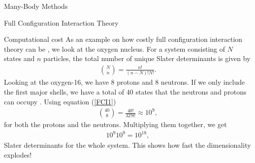 \documentclass[twoside,english]{uiofysmaster}
\begin{document}
\begin{chapter}{Many-Body Methods}
\begin{section}{Full Configuration Interaction Theory}
		\begin{subsection}{Computational cost}
			As an example on how costly  full configuration interaction theory can be \cite{MHJFCI}, we look at the oxygen nucleus. For a system consisting of $N$ states and $n$ particles, the total number of unique Slater determinants is given by 
			\begin{align}
				\binom{N}{n} = \frac{n!}{(n-N)!N!}.
				\label{FCI1}
			\end{align}
			Looking at the oxygen-16, we have $8$ protons and $8$ neutrons. If we only include the first major shells, we have a total of $40$ states that the neutrons and protons can occupy \cite{MHJFCI}. Using equation (\ref{FCI1})
			\begin{align}
				\binom{40}{8} = \frac{40!}{32!8!} \approx 10^9,
			\end{align}
			for both the protons and the neutrons. Multiplying them together, we get 
			\begin{align}
				10^9 10^9 = 10^{18},
			\end{align}
			Slater determinants for the whole system. This shows how fast the dimensionality explodes! 

		\end{subsection}

	\end{section}	


\end{chapter}
\end{document}
